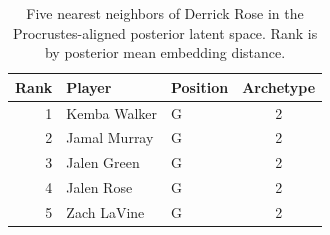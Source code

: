 \begin{table}[htbp]
  \centering\small
  \begin{tabular}{rllc}
    \toprule
    Rank & Player & Position & Archetype \\
    \midrule
    1 & Kemba Walker & G & 2 \\
    2 & Jamal Murray & G & 2 \\
    3 & Jalen Green & G & 2 \\
    4 & Jalen Rose & G & 2 \\
    5 & Zach LaVine & G & 2 \\
    \bottomrule
  \end{tabular}
  \caption{Five nearest neighbors of Derrick Rose in the Procrustes-aligned posterior latent space. Rank is by posterior mean embedding distance.}
  \label{tab:Derrick_Rose_neighbors}
\end{table}

